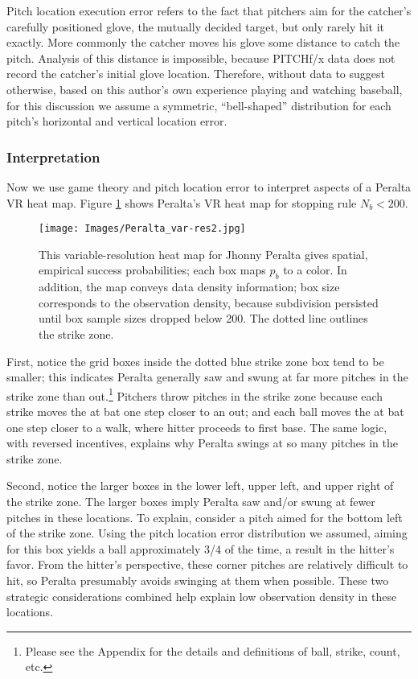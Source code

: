 Pitch location execution error refers to the fact that pitchers aim for the catcher's carefully positioned glove, the mutually decided target, but only rarely hit it exactly. More commonly the catcher moves his glove some distance to catch the pitch.  Analysis of this distance is impossible, because PITCHf/x\textsuperscript{\textregistered} data does not record the catcher's initial glove location. Therefore, without data to suggest otherwise, based on this author's own experience playing and watching baseball, for this discussion we assume a symmetric, ``bell-shaped'' distribution for each pitch's horizontal and vertical location error.

\subsubsection*{Interpretation}
Now we use game theory and pitch location error to interpret aspects of a Peralta VR heat map. Figure \ref{fig:interp} shows Peralta's VR heat map for stopping rule $N_{b} < 200$.
        \begin{figure}[H]
      	\centering      
      	\texttt{[image: Images/Peralta\_var-res2.jpg]}
      	\caption{This variable-resolution heat map for Jhonny Peralta gives spatial, empirical success probabilities; each box maps $p_{b}$ to a color. In addition, the map conveys data density information; box size corresponds to the observation density, because subdivision persisted until box sample sizes dropped below 200. The dotted line outlines the strike zone.}
      	\label{fig:interp}
        \end{figure}
First, notice the grid boxes inside the dotted blue strike zone box tend to be smaller; this indicates Peralta generally saw and swung at far more pitches in the strike zone than out.\footnote{Please see the Appendix for the details and definitions of ball, strike, count, etc.} Pitchers throw pitches in the strike zone because each strike moves the at bat one step closer to an out; and each ball moves the at bat one step closer to a walk, where hitter proceeds to first base. The same logic, with reversed incentives, explains why Peralta swings at so many pitches in the strike zone. 

Second, notice the larger boxes in the lower left, upper left, and upper right of the strike zone. The larger boxes imply Peralta saw and/or swung at fewer pitches in these locations. To explain, consider a pitch aimed for the bottom left of the strike zone. Using the pitch location error distribution we assumed, aiming for this box yields a ball approximately 3/4 of the time, a result in the hitter's favor. From the hitter's perspective, these corner pitches are relatively difficult to hit, so Peralta presumably avoids swinging at them when possible. These two strategic considerations combined help explain low observation density in these locations.

